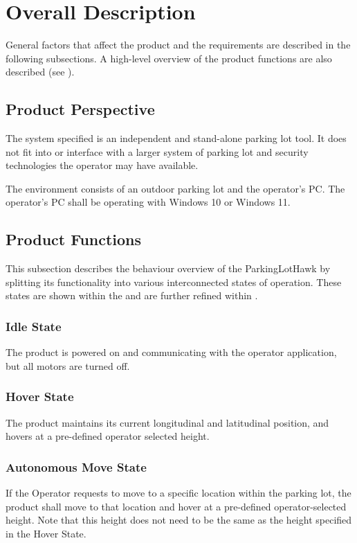 \documentclass{article}
\begin{document}
\section{Overall Description}
\label{sec:Desc}
General factors that affect the product and the requirements are described in the following subsections. A high-level overview of the product functions are also described (see ). 
\subsection{Product Perspective}
The system specified is an independent and stand-alone parking lot tool. It does not fit into or interface with a larger system of parking lot and security technologies the operator may have available. 

The environment consists of an outdoor parking lot and the operator's PC. The operator's PC shall be operating with Windows 10 or Windows 11.

\subsection{Product Functions}
\label{subsec:ProdFunc}
This subsection describes the behaviour overview of the ParkingLotHawk by splitting its functionality into various interconnected states of operation. These states are shown within the  and are further refined within . 
\subsubsection{Idle State}
\label{Idle State}
The product is powered on and communicating with the operator application, but all motors are turned off. 
\subsubsection{Hover State}
\label{Hover State}
The product maintains its current longitudinal and latitudinal position, and hovers at a pre-defined operator selected height. 
\subsubsection{Autonomous Move State}
\label{Autonomous Move State}
If the Operator requests to move to a specific location within the parking lot, the product shall move to that location and hover at a pre-defined operator-selected height. Note that this height does not need to be the same as the height specified in the Hover State. 
\end{document}
